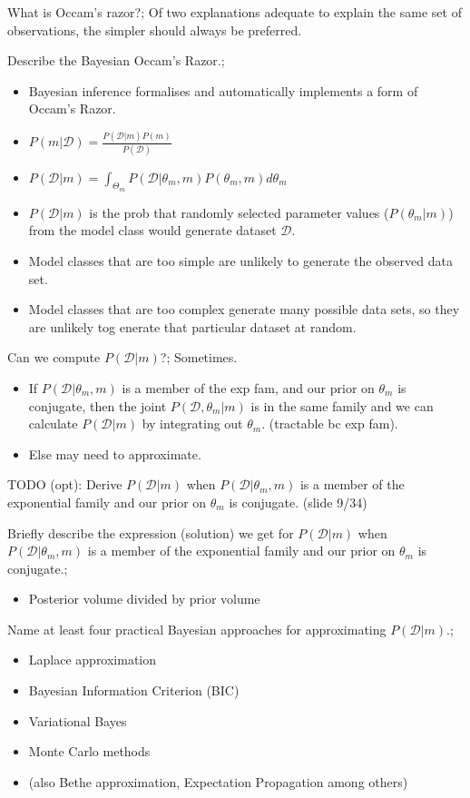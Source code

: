 \documentclass{article}
\begin{document}
What is Occam's razor?; Of two explanations adequate to explain the same set of observations, the simpler should always be preferred.

Describe the Bayesian Occam's Razor.; \begin{itemize}
    \item Bayesian inference formalises and automatically implements a form of Occam's Razor.
    \item $P(m|\mathcal{D})=\frac{P(\mathcal{D}|m)P(m)}{P(\mathcal{D})}$
    \item $P(\mathcal{D}|m)=\int_{\Theta_m}P(\mathcal{D}|\theta_m, m)P(\theta_m, m)d\theta_m$
    \item $P(\mathcal{D}|m)$ is the prob that randomly selected parameter values ($P(\theta_m|m)$) from the model class would generate dataset $\mathcal{D}$.
    \item Model classes that are too simple are unlikely to generate the observed data set. 
    \item Model classes that are too complex generate many possible data sets, so they are unlikely tog enerate that particular dataset at random.
\end{itemize}

Can we compute $P(\mathcal{D}|m)$?; Sometimes. \begin{itemize}
    \item If $P(\mathcal{D}|\theta_m, m)$ is a member of the exp fam, and our prior on $\theta_m$ is conjugate, then the joint $P(\mathcal{D},\theta_m|m)$ is in the same family and we can calculate $P(\mathcal{D}|m)$ by integrating out $\theta_m$. (tractable bc exp fam).
    \item Else may need to approximate.
\end{itemize}

TODO (opt): Derive $P(\mathcal{D}|m)$ when $P(\mathcal{D}|\theta_m, m)$ is a member of the exponential family and our prior on $\theta_m$ is conjugate. (slide 9/34)

Briefly describe the expression (solution) we get for $P(\mathcal{D}|m)$ when $P(\mathcal{D}|\theta_m, m)$ is a member of the exponential family and our prior on $\theta_m$ is conjugate.; \begin{itemize}
    \item Posterior volume divided by prior volume
\end{itemize}

Name at least four practical Bayesian approaches for approximating $P(\mathcal{D}|m)$.; \begin{itemize}
    \item Laplace approximation
    \item Bayesian Information Criterion (BIC)
    \item Variational Bayes
    \item Monte Carlo methods
    \item (also Bethe approximation, Expectation Propagation among others)
\end{itemize}
\end{document}
